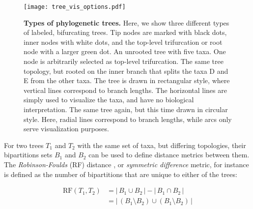\begin{figure}[thb]
    \centering
    \texttt{[image: tree\_vis\_options.pdf]}
    \begin{subfigure}{0pt}
        \label{fig:tree_vis_options:sub:unrooted}
    \end{subfigure}
    \begin{subfigure}{0pt}
        \label{fig:tree_vis_options:sub:rectangular}
    \end{subfigure}
    \begin{subfigure}{0pt}
        \label{fig:tree_vis_options:sub:circular}
    \end{subfigure}
    \caption[Types of phylogenetic trees]{
        \textbf{Types of phylogenetic trees.}
        Here, we show three different types of labeled, bifurcating trees.
        Tip nodes are marked with black dots, inner nodes with white dots,
        and the top-level trifurcation or root node with a larger green dot.
        An unrooted tree with five taxa. One node is arbitrarily selected as top-level trifurcation.
        The same tree topology,
        but rooted on the inner branch that splits the taxa {\sffamily D} and {\sffamily E} from the other taxa.
        The tree is drawn in rectangular style,
        where vertical lines correspond to branch lengths.
        The horizontal lines are simply used to visualize the taxa, and have no biological interpretation.
        The same tree again, but this time drawn in circular style.
        Here, radial lines correspond to branch lengths, while arcs only serve visualization purposes.
    }
    \label{fig:tree_vis_options}
\end{figure}

For two trees $T_1$ and $T_2$ with the same set of taxa, but differing topologies,
their bipartitions sets $B_1$ and $B_2$ can be used to define distance metrics between them.
The \emph{Robinson-Foulds} (RF) distance \cite{Robinson1981}, or \emph{symmetric difference} metric,
for instance is defined as the number of bipartitions that are unique to either of the trees:

\begin{align}
    \label{ch:Foundations:sec:TreeOfLife:eq:RF-Distance}
    \mbox{RF}(T_1, T_2)
    &= |\, B_1 \cup B_2 \,| - |\, B_1 \cap B_2 \,| \nonumber \\[0.7em]
    &= |\, ( B_1 \setminus B_2 ) \cup ( B_1 \setminus B_2 ) \,|
\end{align}

